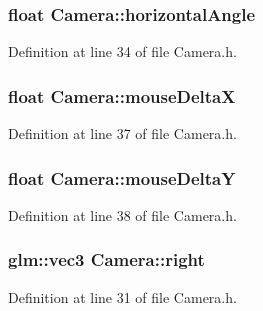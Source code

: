 \subsubsection[{horizontal\+Angle}]{\setlength{\rightskip}{0pt plus 5cm}float Camera\+::horizontal\+Angle\hspace{0.3cm}{\ttfamily [private]}}\label{class_camera_aad9d573147be409e929251eca0bea339}


Definition at line 34 of file Camera.\+h.

\hypertarget{class_camera_a38f42e9b04d2180f267af1bdd5b87216}{}
\subsubsection[{mouse\+Delta\+X}]{\setlength{\rightskip}{0pt plus 5cm}float Camera\+::mouse\+Delta\+X\hspace{0.3cm}{\ttfamily [private]}}\label{class_camera_a38f42e9b04d2180f267af1bdd5b87216}


Definition at line 37 of file Camera.\+h.

\hypertarget{class_camera_a65944911597dcfb60e21300ed8c62305}{}
\subsubsection[{mouse\+Delta\+Y}]{\setlength{\rightskip}{0pt plus 5cm}float Camera\+::mouse\+Delta\+Y\hspace{0.3cm}{\ttfamily [private]}}\label{class_camera_a65944911597dcfb60e21300ed8c62305}


Definition at line 38 of file Camera.\+h.

\hypertarget{class_camera_aebffcc6289dd99df7554b18d00a81161}{}
\subsubsection[{right}]{\setlength{\rightskip}{0pt plus 5cm}glm\+::vec3 Camera\+::right\hspace{0.3cm}{\ttfamily [private]}}\label{class_camera_aebffcc6289dd99df7554b18d00a81161}


Definition at line 31 of file Camera.\+h.

\hypertarget{class_camera_a3fe5f351380fb118ffc600591769f049}{}
